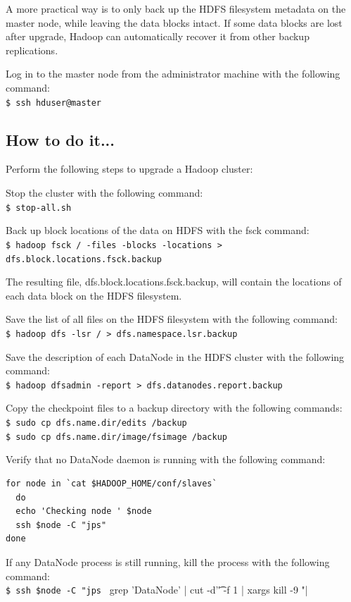 A more practical way is to only back up the HDFS filesystem metadata on the master node, while leaving the data blocks intact. If some data blocks are lost after upgrade, Hadoop can automatically recover it from other backup replications.

Log in to the master node from the administrator machine with the following command: \\
\verb|$ ssh hduser@master|

\subsection*{How to do it...}
Perform the following steps to upgrade a Hadoop cluster: 

Stop the cluster with the following command: \\
\verb|$ stop-all.sh|

Back up block locations of the data on HDFS with the fsck command: \\
\verb|$ hadoop fsck / -files -blocks -locations > dfs.block.locations.fsck.backup|

The resulting file, dfs.block.locations.fsck.backup, will contain the locations of each data block on the HDFS filesystem.

Save the list of all files on the HDFS filesystem with the following command: \\
\verb|$ hadoop dfs -lsr / > dfs.namespace.lsr.backup|

Save the description of each DataNode in the HDFS cluster with the following command: \\ 
\verb|$ hadoop dfsadmin -report > dfs.datanodes.report.backup| 

Copy the checkpoint files to a backup directory with the following commands: \\
\verb|$ sudo cp dfs.name.dir/edits /backup| \\ 
\verb|$ sudo cp dfs.name.dir/image/fsimage /backup| 

Verify that no DataNode daemon is running with the following command:
\begin{verbatim}
for node in `cat $HADOOP_HOME/conf/slaves`
  do
  echo 'Checking node ' $node
  ssh $node -C "jps"
done
\end{verbatim}

If any DataNode process is still running, kill the process with the following command: \\
\verb|$ ssh $node -C "jps | grep 'DataNode' | cut -d'\t' -f 1 | xargs kill -9 "|

